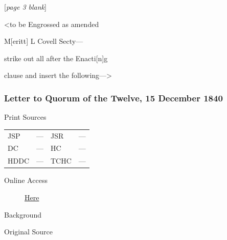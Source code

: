 				[\textit{page 3 blank}]

				\begin{tightcenter}
					<to be Engrossed as amended

					M[eritt] L Covell Secty---

					strike out all after the Enacti[n]g

					clause and insert the following--->
				\end{tightcenter}
				
		\subsubsection{Letter to Quorum of the Twelve, 15 December 1840}
			\label{EMS-1840-JS-15-DEC-1840}
			
			\begin{description}
				\item[Print Sources]
			\end{description}

			\begin{tabular}{p{0.5in}p{1in}p{0.5in}p{1in}}
				JSP	 	& ---		& JSR 		& --- \\
				DC	 	& ---		& HC 		& --- \\
				HDDC 	& ---		& TCHC 		& --- \\
			\end{tabular}
			
			\begin{description}
				\item[Online Access] \href{https://www.josephsmithpapers.org/paper-summary/letter-to-quorum-of-the-twelve-15-december-1840/1}{Here}
			\end{description}
			
			\begin{description}
				\item[Background]
			\end{description}
			
			
			\begin{description}
				\item[Original Source]
			\end{description}
			
